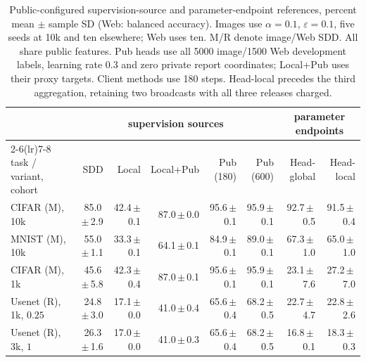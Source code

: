 \begin{table}[t]
\centering
\caption{Public-configured supervision-source and parameter-endpoint references, percent mean $\pm$ sample SD (Web: balanced accuracy). Images use $\alpha=0.1$, $\varepsilon=0.1$, five seeds at 10k and ten elsewhere; Web uses ten. M/R denote image/Web SDD. All share public features. Pub heads use all 5000 image/1500 Web development labels, learning rate 0.3 and zero private report coordinates; Local+Pub uses their proxy targets. Client methods use 180 steps. Head-local precedes the third aggregation, retaining two broadcasts with all three releases charged.}
\label{tab:attribution}\label{tab:head-local}
\small\setlength{\tabcolsep}{3pt}
\begin{tabular}{@{}lrrrrrrr@{}}\toprule
\multicolumn{1}{c}{} & \multicolumn{5}{c}{supervision sources} & \multicolumn{2}{c}{parameter endpoints} \\ \cmidrule(lr){2-6}\cmidrule(lr){7-8}
task / variant, cohort & SDD & Local & Local+Pub & Pub (180) & Pub (600) & Head-global & Head-local \\\midrule
CIFAR (M), 10k & 85.0\,$\pm$\,2.9 & 42.4\,$\pm$\,0.1 & 87.0\,$\pm$\,0.0 & 95.6\,$\pm$\,0.1 & 95.9\,$\pm$\,0.1 & 92.7\,$\pm$\,0.5 & 91.5\,$\pm$\,0.4 \\
MNIST (M), 10k & 55.0\,$\pm$\,1.1 & 33.3\,$\pm$\,0.1 & 64.1\,$\pm$\,0.1 & 84.9\,$\pm$\,0.1 & 89.0\,$\pm$\,0.1 & 67.3\,$\pm$\,1.0 & 65.0\,$\pm$\,1.0 \\
CIFAR (M), 1k & 45.6\,$\pm$\,5.8 & 42.3\,$\pm$\,0.4 & 87.0\,$\pm$\,0.1 & 95.6\,$\pm$\,0.1 & 95.9\,$\pm$\,0.1 & 23.1\,$\pm$\,7.6 & 27.2\,$\pm$\,7.0 \\
Usenet (R), 1k, $0.25$ & 24.8\,$\pm$\,3.0 & 17.1\,$\pm$\,0.0 & 41.0\,$\pm$\,0.4 & 65.6\,$\pm$\,0.4 & 68.2\,$\pm$\,0.5 & 22.7\,$\pm$\,4.7 & 22.8\,$\pm$\,2.6 \\
Usenet (R), 3k, $1$ & 26.3\,$\pm$\,1.6 & 17.0\,$\pm$\,0.0 & 41.0\,$\pm$\,0.3 & 65.6\,$\pm$\,0.4 & 68.2\,$\pm$\,0.5 & 16.8\,$\pm$\,0.1 & 18.3\,$\pm$\,0.3 \\
\bottomrule\end{tabular}
\end{table}
